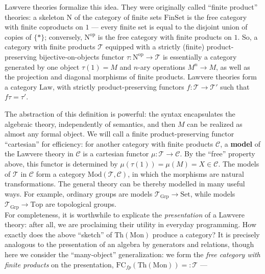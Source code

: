 \documentclass{amsart}
\theoremstyle{definition}
\newcommand{\Th}{\mathrm{Th}}
\newcommand{\Set}{\mathrm{Set}}
\newcommand{\Grp}{\mathrm{Grp}}
\newcommand{\Law}{\mathrm{Law}}
\newcommand{\Top}{\mathrm{Top}}
\newcommand{\Mon}{\mathrm{Mon}}
\newcommand{\Mod}{\mathrm{Mod}}
\newcommand{\FinSet}{\mathrm{FinSet}}
\newcommand{\op}{\mathrm{op}}
\newcommand{\NN}{\mathrm{N}}
\newcommand{\C}{\mathscr{C}}
\newcommand{\T}{\mathscr{T}}
\newcommand{\maps}{\colon}
\begin{document}
Lawvere theories formalize this idea. They were originally called ``finite product'' theories: a skeleton $\NN$ of the category of finite sets $\FinSet$ is the free category with finite coproducts on $1$ --- every finite set is equal to the disjoint union of copies of $\{*\}$; conversely, $\NN^\op$ is the free category with finite products on $1$. So, a category with finite products $\T$ equipped with a strictly (finite) product-preserving bijective-on-objects functor $\tau\maps\NN^\op \to \T$ is essentially a category generated by one object $\tau(1) = M$ and $n$-ary operations $M^n \to M$, as well as the projection and diagonal morphisms of finite products. Lawvere theories form a category $\Law$, with strictly product-preserving functors $f\maps \T\to \T'$ such that $f\tau = \tau'$.

The abstraction of this definition is powerful: the syntax encapsulates the algebraic theory, independently of semantics, and then $M$ can be realized as almost any formal object. We will call a finite product-preserving functor ``cartesian'' for efficiency: for another category with finite products $\C$, a \textbf{model} of the Lawvere theory in $\C$ is a cartesian functor $\mu\maps \T \to \C$. By the ``free'' property above, this functor is determined by $\mu(\tau(1)) = \mu(M) = X \in \C$. The models of $\T$ in $\C$ form a category $\Mod(\T,\C)$, in which the morphisms are natural transformations. The general theory can be thereby modelled in many useful ways. For example, ordinary groups are models $\T_\Grp \to \Set$, while models $\T_\Grp \to \Top$ are topological groups.\\

For completeness, it is worthwhile to explicate the \textit{presentation} of a Lawvere theory: after all, we are proclaiming their utility in everyday programming. How exactly does the above ``sketch'' of $\Th(\Mon)$ produce a category? It is precisely analogous to the presentation of an algebra by generators and relations, though here we consider the ``many-object'' generalization: we form the \textit{free category with finite products} on the presentation, $\mathrm{FC}_{fp}(\Th(\Mon)) =: \T$ ---
\end{document}
